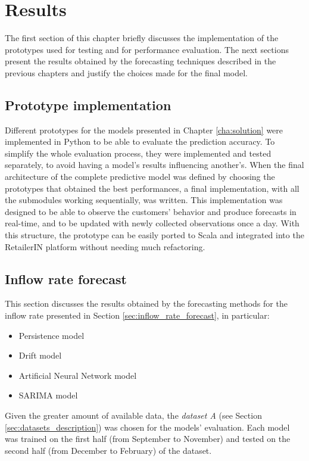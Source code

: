 \chapter{Results}
\label{cha:results}

The first section of this chapter briefly discusses the implementation of the prototypes used for testing and for performance evaluation. The next sections present the results obtained by the forecasting techniques described in the previous chapters and justify the choices made for the final model.

\section{Prototype implementation}
\label{sec:prototype_implementation}
Different prototypes for the models presented in Chapter \ref{cha:solution} were implemented in Python to be able to evaluate the prediction accuracy. To simplify the whole evaluation process, they were implemented and tested separately, to avoid having a model’s results influencing another’s. When the final architecture of the complete predictive model was defined by choosing the prototypes that obtained the best performances, a final implementation, with all the submodules working sequentially, was written. This implementation was designed to be able to observe the customers' behavior and produce forecasts in real-time, and to be updated with newly collected observations once a day. With this structure, the prototype can be easily ported to Scala and integrated into the RetailerIN platform without needing much refactoring.

\section{Inflow rate forecast}
\label{sec:inflow_rate_forecast_results}
This section discusses the results obtained by the forecasting methods for the inflow rate presented in Section \ref{sec:inflow_rate_forecast}, in particular:
\begin{itemize}
  \item Persistence model
  \item Drift model
  \item Artificial Neural Network model
  \item SARIMA model
\end{itemize}

Given the greater amount of available data, the \emph{dataset A} (see Section \ref{sec:datasets_description}) was chosen for the models' evaluation. Each model was trained on the first half (from September to November) and tested on the second half (from December to February) of the dataset.

